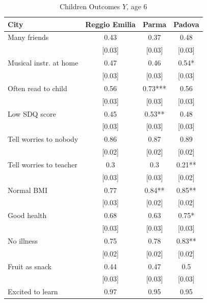 \documentclass[12pt]{article}
\begin{document}
\begin{table}[ht]
\caption{Children Outcomes $Y$, age 6}
\label{tab:childOutcomes}
\begin{center}
    \begin{tabular}{lccc}
    \hline \hline
    City  & Reggio Emilia & Parma & Padova \\
    \hline

    Many friends & 0.43  & 0.37  & 0.48 \\
          & [0.03] & [0.03] & [0.03] \\
    Musical instr. at home & 0.47  & 0.46  & 0.54* \\
          & [0.03] & [0.03] & [0.03] \\
    Often read to child & 0.56  & 0.73*** & 0.56 \\
          & [0.03] & [0.03] & [0.03] \\
    Low SDQ score & 0.45  & 0.53** & 0.48 \\
          & [0.03] & [0.03] & [0.03] \\
    Tell worries to nobody & 0.86  & 0.87  & 0.89 \\
          & [0.02] & [0.02] & [0.02] \\
    Tell worries to teacher & 0.3   & 0.3   & 0.21** \\
          & [0.03] & [0.03] & [0.02] \\
    Normal BMI & 0.77  & 0.84** & 0.85** \\
          & [0.03] & [0.02] & [0.02] \\
    Good health & 0.68  & 0.63  & 0.75* \\
          & [0.03] & [0.03] & [0.03] \\
    No illness & 0.75  & 0.78  & 0.83** \\
          & [0.02] & [0.02] & [0.02] \\
    Fruit as snack & 0.44  & 0.47  & 0.5 \\
          & [0.03] & [0.03] & [0.03] \\
    Excited to learn & 0.97  & 0.95  & 0.95 \\

\end{tabular}
\end{center}
\end{table}
\end{document}
